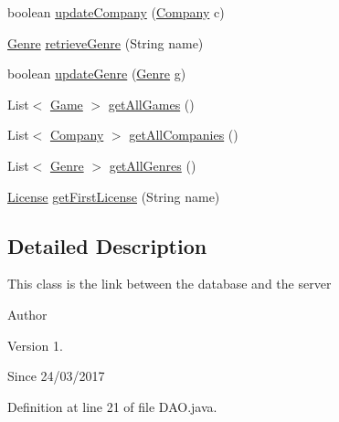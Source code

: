 \begin{DoxyCompactItemize}
\item 
boolean \hyperlink{classes_1_1deusto_1_1server_1_1db_1_1dao_1_1_d_a_o_a0748467c3346a5bcdcd79b508562b6dc}{update\+Company} (\hyperlink{classes_1_1deusto_1_1server_1_1db_1_1data_1_1_company}{Company} c)
\item 
\hyperlink{classes_1_1deusto_1_1server_1_1db_1_1data_1_1_genre}{Genre} \hyperlink{classes_1_1deusto_1_1server_1_1db_1_1dao_1_1_d_a_o_a16b0af798fbb00cd29a505491c57e2cd}{retrieve\+Genre} (String name)
\item 
boolean \hyperlink{classes_1_1deusto_1_1server_1_1db_1_1dao_1_1_d_a_o_ae08384fb32fa6936c93f6292dbe02c7e}{update\+Genre} (\hyperlink{classes_1_1deusto_1_1server_1_1db_1_1data_1_1_genre}{Genre} g)
\item 
List$<$ \hyperlink{classes_1_1deusto_1_1server_1_1db_1_1data_1_1_game}{Game} $>$ \hyperlink{classes_1_1deusto_1_1server_1_1db_1_1dao_1_1_d_a_o_af49ed57bdac4dec48ab7616602d12df2}{get\+All\+Games} ()
\item 
List$<$ \hyperlink{classes_1_1deusto_1_1server_1_1db_1_1data_1_1_company}{Company} $>$ \hyperlink{classes_1_1deusto_1_1server_1_1db_1_1dao_1_1_d_a_o_ac564970c7e308393497e874655470aaa}{get\+All\+Companies} ()
\item 
List$<$ \hyperlink{classes_1_1deusto_1_1server_1_1db_1_1data_1_1_genre}{Genre} $>$ \hyperlink{classes_1_1deusto_1_1server_1_1db_1_1dao_1_1_d_a_o_ac1cb7032ef21f53dead8347ef440f431}{get\+All\+Genres} ()
\item 
\hyperlink{classes_1_1deusto_1_1server_1_1db_1_1data_1_1_license}{License} \hyperlink{classes_1_1deusto_1_1server_1_1db_1_1dao_1_1_d_a_o_a4a5a54059bac00ea6f3b6d21f2a31a02}{get\+First\+License} (String name)
\end{DoxyCompactItemize}


\subsection{Detailed Description}
This class is the link between the database and the server \begin{DoxyAuthor}{Author}

\end{DoxyAuthor}
\begin{DoxyVersion}{Version}
1. 
\end{DoxyVersion}
\begin{DoxySince}{Since}
24/03/2017 
\end{DoxySince}


Definition at line 21 of file D\+A\+O.\+java.




